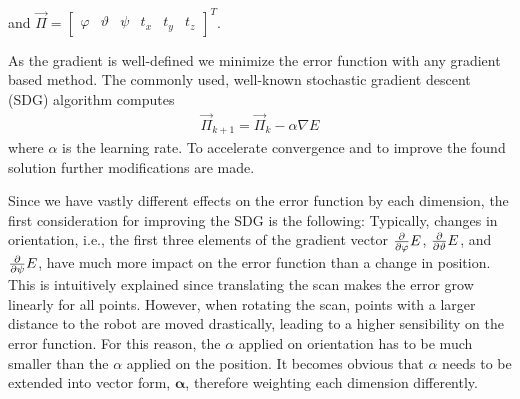 and $\vec{\Pi}=\begin{bmatrix}\varphi & \vartheta & \psi & t_x & t_y & t_z\end{bmatrix}^T$.

As the gradient is well-defined we minimize the error function with any gradient based method. 
The commonly used, well-known stochastic gradient descent (SDG) algorithm computes 
\begin{align}
    \vec{\Pi}_{k+1} = \vec{\Pi}_{k} - \alpha \nabla E
\end{align}
where $\alpha$ is the learning rate.
To accelerate convergence and to improve the found solution further modifications are made.

Since we have vastly different effects on the error function by each dimension, the first consideration for improving the SDG is the following:
Typically, changes in orientation, i.e., the first three elements of the gradient vector $\frac{\partial}{\partial \varphi}E$, $\frac{\partial}{\partial \vartheta}E$, and $\frac{\partial}{\partial \psi}E$, have much more impact on the error function than a change in position.
This is intuitively explained since translating the scan makes the error grow linearly for all points.
However, when rotating the scan, points with a larger distance to the robot are moved drastically, leading to a higher sensibility on the error function.
For this reason, the $\alpha$ applied on orientation has to be much smaller than the $\alpha$ applied on the position.
It becomes obvious that $\alpha$ needs to be extended into vector form, $\boldsymbol\alpha$, therefore weighting each dimension differently.

